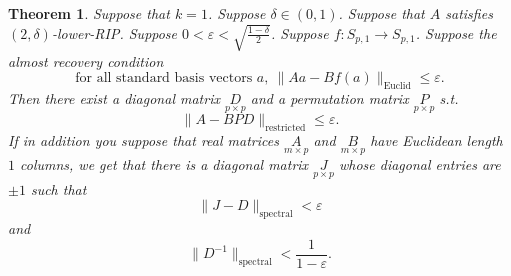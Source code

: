 \documentclass[11pt]{amsart}
\newtheorem{theorem}{Theorem}
\begin{document}
\begin{theorem}\label{kIsOne}
Suppose that $k=1$.  Suppose $\delta \in (0,1)$.  
Suppose that $A$ satisfies $(2,\delta)$-lower-RIP. 
Suppose $0<\varepsilon < \sqrt{\frac{1-\delta}{2}}$. 
Suppose $f:S_{p,1}\rightarrow S_{p,1}$.
Suppose the almost recovery condition 
\begin{equation}\label{standardBasisApproximation}
\text{for all standard basis vectors }a, \ \|Aa - Bf(a)\|_\text{Euclid} \leq \varepsilon .
\end{equation}
 Then there exist a diagonal matrix $\underset{p\times p}{D}$ and a permutation matrix 
 $\underset{p\times p}{P}$ s.t. 
\begin{equation}\label{newnormclaim}
\|A-BPD\|_\text{restricted}\leq \varepsilon.
\end{equation} 
 If in addition you suppose that real matrices $\underset{m \times p}{A}$ and $\underset{m \times p}{B}$ have Euclidean length $1$ columns, we get that there is a diagonal matrix $\underset{p\times p}{J}$ whose diagonal
entries are $\pm1$ such that 
 \begin{equation} \label{deesinversespectralnorm}
 \|J-D\|_\text{spectral}<\varepsilon
 \end{equation}
 and
 \begin{equation} \label{deesinversespectralnorm}
 \|D^{-1}\|_\text{spectral}<\frac{1}{1-\varepsilon}.
 \end{equation}
\end{theorem}
\end{document}
